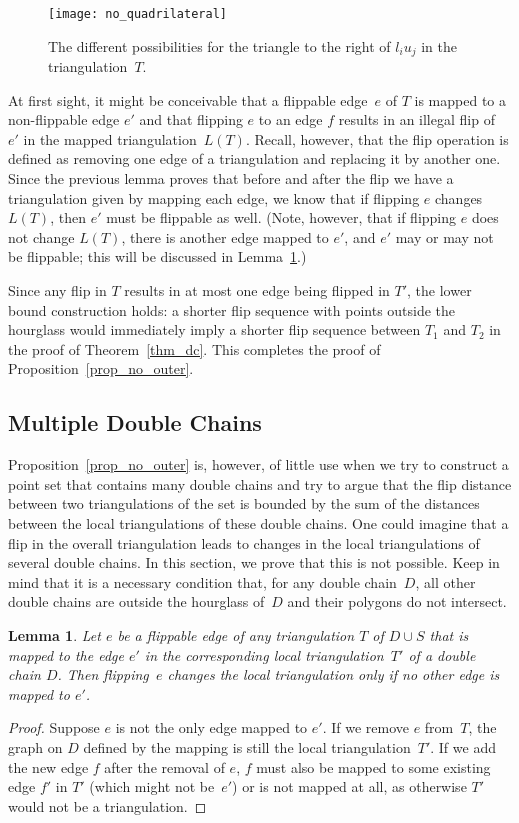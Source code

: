 \documentclass[11pt,a4paper]{article}
\newcommand{\myqed}{\qed}
\renewcommand{\myqed}{}
\newtheorem{lemma}[theorem]{Lemma}
\begin{document}
\begin{figure}
\centering
\texttt{[image: no\_quadrilateral]}
\caption{The different possibilities for the triangle to the right of $l_i u_j$ in the triangulation~$T$.}
\label{fig_no_quadrilateral}
\end{figure}


At first sight, it might be conceivable that a flippable edge~$e$ of $T$ is mapped to a non-flippable edge $e'$ and that flipping $e$ to an edge $f$ results in an illegal flip of~$e'$ in the mapped triangulation~$L(T)$.
Recall, however, that the flip operation is defined as removing one edge of a triangulation and replacing it by another one.
Since the previous lemma proves that before and after the flip we have a triangulation given by mapping each edge, we know that if flipping $e$ changes~$L(T)$, then $e'$ must be flippable as well.
(Note, however, that if flipping $e$ does not change $L(T)$, there is another edge mapped to $e'$, and $e'$ may or may not be flippable; this will be discussed in Lemma~\ref{lem_mapping}.)

Since any flip in $T$ results in at most one edge being flipped in $T'$, the lower bound construction holds:
a shorter flip sequence with points outside the hourglass would immediately imply a shorter flip sequence between $T_1$ and $T_2$ in the proof of Theorem~\ref{thm_dc}.
This completes the proof of Proposition~\ref{prop_no_outer}.

\subsection{Multiple Double Chains}
Proposition~\ref{prop_no_outer} is, however, of little use when we try to construct a point set that contains many double chains and try to argue that the flip distance between two triangulations of the set is bounded by the sum of the distances between the local triangulations of these double chains.
One could imagine that a flip in the overall triangulation leads to changes in the local triangulations of several double chains.
In this section, we prove that this is not possible. Keep in mind that it is a necessary condition that, for any double chain~$D$, all other double chains are outside the hourglass of~$D$ and their polygons do not intersect.

\begin{lemma}\label{lem_mapping}
Let $e$ be a flippable edge of any triangulation $T$ of $D \cup S$ that is mapped to the edge $e'$ in the corresponding local triangulation~$T'$ of a double chain $D$.
Then flipping~$e$ changes the local triangulation only if no other edge is mapped to $e'$.
\end{lemma}
\begin{proof}
Suppose $e$ is not the only edge mapped to $e'$.
If we remove $e$ from~$T$, the graph on $D$ defined by the mapping is still the local triangulation~$T'$.
If we add the new edge $f$ after the removal of $e$, $f$ must also be mapped to some existing edge $f'$ in $T'$ (which might not be~$e'$) or is not mapped at all, as otherwise $T'$ would not be a triangulation. 
\myqed
\end{proof}
\end{document}
